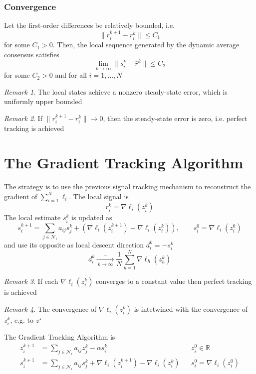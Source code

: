 \documentclass{book}
\newcommand{\R}{\mathbb{R}}
\theoremstyle{theoremv2}
\theoremstyle{defv2}
\theoremstyle{remark}
\newtheorem*{remark}{Remark}
\theoremstyle{remark}
\theoremstyle{definition}
\theoremstyle{definition}
\begin{document}
\subsubsection{Convergence}
Let the first-order differences be relatively bounded, i.e. 
\[
    \|r_i^{k+1}-r_i^k\| \leq C_1
\]
for some $C_1>0$. Then, the local sequence generated by the dynamic average consensus satisfies 
\[
    \lim_{k\to\infty} \|s_i^k - \bar{r}^k\|\leq C_2
\]
for some $C_2>0$ and for all $i=1,\dots,N$
\begin{remark}
    The local states achieve a nonzero steady-state error, which is uniformly upper bounded
\end{remark}
\begin{remark}
    If $\|r_i^{k+1}-r_i^k\|\to0$, then the steady-state error is zero, i.e. perfect tracking is achieved
\end{remark}

\section{The Gradient Tracking Algorithm}
The strategy is to use the previous signal tracking mechanism to reconstruct the gradient of $\displaystyle\sum_{i=1}^{N}\ell_i$. The local signal is 
\[
    r_i^k = \nabla \ell_i(z_i^k)
\]
The local estimate $s_i^k$ is updated as
\[
    s_i^{k+1} = \displaystyle\sum_{j\in\mathcal{N}_i} a_{ij}s_j^k + \left(\nabla\ell_i(z_i^{k+1})-\nabla\ell_i(z_i^k)\right), \qquad s_i^0 = \nabla\ell_i(z_i^0)
\]
and use its opposite as local descent direction $d_i^k = -s_i^k$
\[
    d_i^k \xrightarrow[\ k\to\infty\ ]-\displaystyle\frac{1}{N} \displaystyle\sum_{h=1}^{N}\nabla\ell_h(z_h^k)
\]
\begin{remark}
    If each $\nabla\ell_i(z_i^k)$ converges to a constant value then perfect tracking is achieved
\end{remark}
\begin{remark}
    The convergence of $\nabla\ell_i(z_i^k)$ is intetwined with the convergence of $z_i^k$, e.g. to $z^\star$
\end{remark}
The Gradient Tracking Algorithm is 
\begin{align*}
    z_i^{k+1} &= \displaystyle\sum_{j\in\mathcal{N}_i} a_{ij}z_j^k - \alpha s_i^k && z_i^0\in\R\\
    s_i^{k+1} &= \displaystyle\sum_{j\in\mathcal{N}_i} a_{ij}s_j^k + \nabla\ell_i(z_i^{k+1}) - \nabla\ell_i(z_i^k) &&s_i^0=\nabla\ell_i(z_i^0)
\end{align*}
\end{document}
